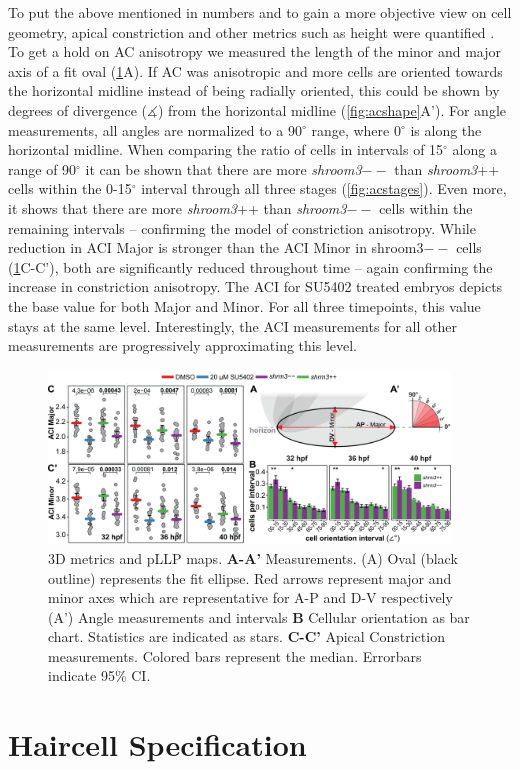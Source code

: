 \documentclass[11pt,singlespacinge,twoside]{reedthesis} %
\begin{document}
To put the above mentioned in numbers and to gain a more objective view on cell geometry, apical constriction and other metrics such as height were quantified . To get a hold on AC anisotropy we measured the length of the minor and major axis of a fit oval (\ref{fig:acaci}A). If AC was anisotropic and more cells are oriented towards the horizontal midline instead of being radially oriented, this could be shown by degrees of divergence (\(\measuredangle\)) from the horizontal midline (\ref{fig:acshape}A').
For angle measurements, all angles are normalized to a 90\(^\circ\) range, where 0\(^\circ\) is along the horizontal midline. When comparing the ratio of cells in intervals of 15\(^\circ\) along a range of 90\(^\circ\) it can be shown that there are more \emph{shroom3}\(--\) than \emph{shroom3}++ cells within the 0-15\(^\circ\) interval through all three stages (\ref{fig:acstages}). Even more, it shows that there are more \emph{shroom3}++ than \emph{shroom3}\(--\) cells within the remaining intervals -- confirming the model of constriction anisotropy.
While reduction in ACI Major is stronger than the ACI Minor in shroom3\(--\) cells (\ref{fig:acaci}C-C'), both are significantly reduced throughout time -- again confirming the increase in constriction anisotropy. The ACI for SU5402 treated embryos depicts the base value for both Major and Minor. For all three timepoints, this value stays at the same level. Interestingly, the ACI measurements for all other measurements are progressively approximating this level.


\begin{figure}

{\centering \includegraphics[width=0.95\textwidth]{figures/results/04_constriction/Figure_5-2} 

}

\caption[Apical Constriction in 3D]{3D metrics and pLLP maps. \textbf{A-A'} Measurements. (A) Oval (black outline) represents the fit ellipse. Red arrows represent major and minor axes which are representative for A-P and D-V respectively (A') Angle measurements and intervals \textbf{B} Cellular orientation as bar chart. Statistics are indicated as stars. \textbf{C-C'} Apical Constriction measurements. Colored bars represent the median. Errorbars indicate 95\% CI.}\label{fig:acaci}
\end{figure}
\hypertarget{res-hc}{%
\section{Haircell Specification}\label{res-hc}}
\end{document}
